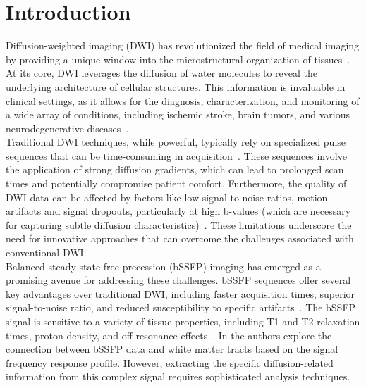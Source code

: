 \chapter{Introduction}

Diffusion-weighted imaging (DWI) has revolutionized the field of medical imaging by providing a unique window into the microstructural organization of tissues~\autocite{huisman_diffusion-weighted_2010}.
At its core, DWI leverages the diffusion of water molecules to reveal the underlying architecture of cellular structures.
This information is invaluable in clinical settings, as it allows for the diagnosis, characterization, and monitoring of a wide array of conditions, including ischemic stroke, brain tumors, and various neurodegenerative diseases~\autocite{sener_diffusion_2001}. \\

Traditional DWI techniques, while powerful, typically rely on specialized pulse sequences that can be time-consuming in acquisition~\autocite{bernstein_handbook_2004}.
These sequences involve the application of strong diffusion gradients, which can lead to prolonged scan times and potentially compromise patient comfort.
Furthermore, the quality of DWI data can be affected by factors like low signal-to-noise ratios, motion artifacts and signal dropouts, particularly at high b-values (which are necessary for capturing subtle diffusion characteristics)~\autocite{tournier_diffusion_2011}.
These limitations underscore the need for innovative approaches that can overcome the challenges associated with conventional DWI. \\

Balanced steady-state free precession (bSSFP) imaging has emerged as a promising avenue for addressing these challenges.
bSSFP sequences offer several key advantages over traditional DWI, including faster acquisition times, superior signal-to-noise ratio, and reduced susceptibility to specific artifacts~\autocite{scheffler_principles_2003}.
The bSSFP signal is sensitive to a variety of tissue properties, including T1 and T2 relaxation times, proton density, and off-resonance effects~\autocite{heule_triple_2014, bieri_fundamentals_2013}.
In \autocite{miller_asymmetries_2010i, miller_asymmetries_2010ii} the authors explore the connection between bSSFP data and white matter tracts based on the signal frequency response profile.
However, extracting the specific diffusion-related information from this complex signal requires sophisticated analysis techniques. \\

